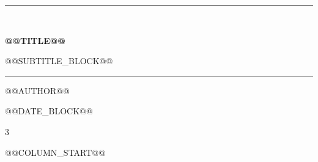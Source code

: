 \documentclass[UTF8,a4paper,10pt,fontset=none]{ctexart}
\makeatletter
\newcommand{\LibraryTitle}{@@TITLE@@}
\newcommand{\LibraryAuthor}{@@AUTHOR@@}
\makeatother
\begin{document}
\begin{titlepage}
  \thispagestyle{empty}
  \centering
  \vspace*{0.16\textheight}
  {\color{LibraryNavy}\rule{0.78\textwidth}{1.1pt}}\\[1.4em]
  {\fontsize{28pt}{34pt}\selectfont\bfseries\color{LibraryNavy}\LibraryTitle\par}
@@SUBTITLE_BLOCK@@
  \vspace{1.4em}
  {\color{LibraryNavy}\rule{0.78\textwidth}{1.1pt}}
  \vfill
  {\large\LibraryAuthor\par}
@@DATE_BLOCK@@
  \vspace*{0.1\textheight}
\end{titlepage}

\begingroup
\fontsize{8.5pt}{10pt}\selectfont
\begin{multicols*}{3}
\tableofcontents
\end{multicols*}
\endgroup
\clearpage

@@COLUMN_START@@
\fontsize{9pt}{10.8pt}\selectfont

\end{document}
